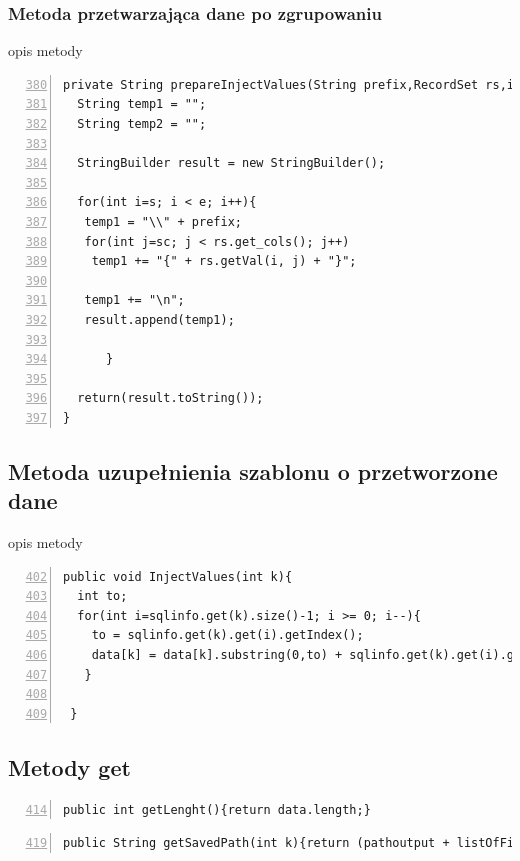 \subsubsection*{Metoda przetwarzająca dane po zgrupowaniu}
opis metody
 \begin{lstlisting}[numbers=left,firstnumber=380]
 private String prepareInjectValues(String prefix,RecordSet rs,int s, int e,int sc){
  String temp1 = "";
  String temp2 = "";

  StringBuilder result = new StringBuilder();

  for(int i=s; i < e; i++){
   temp1 = "\\" + prefix;
   for(int j=sc; j < rs.get_cols(); j++)
    temp1 += "{" + rs.getVal(i, j) + "}";

   temp1 += "\n";
   result.append(temp1);

      }

  return(result.toString());
}    
\end{lstlisting}


\subsection{Metoda uzupełnienia szablonu o przetworzone dane}

opis metody
 \begin{lstlisting}[numbers=left,firstnumber=402]
 public void InjectValues(int k){
  int to;
  for(int i=sqlinfo.get(k).size()-1; i >= 0; i--){
    to = sqlinfo.get(k).get(i).getIndex();
    data[k] = data[k].substring(0,to) + sqlinfo.get(k).get(i).getData() + data[k].substring(to,data[k].length());
   }
        
 }
\end{lstlisting}


\subsection{Metody get}



 \begin{lstlisting}[numbers=left,firstnumber=414]
 public int getLenght(){return data.length;}
 \end{lstlisting}
 
 \begin{lstlisting}[numbers=left,firstnumber=419]
 public String getSavedPath(int k){return (pathoutput + listOfFiles[k].getName());}
     \end{lstlisting}
     
